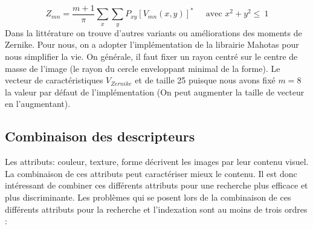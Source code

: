 \begin{equation}
Z_{mn} = \frac{m+1}{\pi} \sum_{x} \sum_{y} P_{xy}[V_{mn}(x,y)]^{*} ~~~~~\mbox{ avec $x^{2} + y^{2} \leq ~1$}
\end{equation}
Dans la littérature on trouve d'autres variants ou améliorations des moments de Zernike. Pour nous, on a adopter l'implémentation de la librairie Mahotas pour nous simplifier la vie. On générale, il faut fixer un rayon centré sur le centre de masse de l'image (le rayon du cercle enveloppant minimal de la forme).
Le vecteur de caractéristiques $ V_{Zernike} $ et de taille 25 puisque nous avons fixé $ m = 8 $ la valeur par défaut de l'implémentation (On peut augmenter la taille de vecteur en l'augmentant).

\subsection{Combinaison des descripteurs}
Les attributs: couleur, texture, forme décrivent les images par leur contenu visuel. La combinaison de ces attributs peut caractériser mieux le contenu. Il est donc intéressant de
combiner ces différents attributs pour une recherche plus efficace et plus discriminante. Les problèmes qui se posent lors de la combinaison de ces différents attributs pour la recherche et l’indexation sont au moins de trois ordres :

